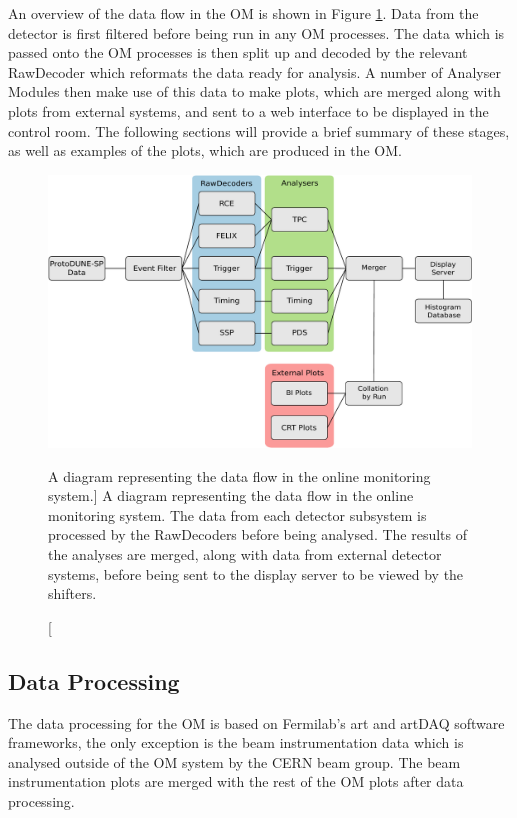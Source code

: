An overview of the data flow in the OM is shown in Figure \ref{fig:om_flow}. 
Data from the detector is first filtered before being run in any OM processes. 
The data which is passed onto the OM processes is then split up and decoded by 
the relevant RawDecoder which reformats the data ready for analysis. A number 
of Analyser Modules then make use of this data to make plots, which are merged 
along with plots from external systems, and sent to a web interface to be 
displayed in the control room. The following sections will provide a brief 
summary of these stages, as well as examples of the plots, which are produced in
the OM.

\begin{figure}
	\centering
	\includegraphics[width=\textwidth]{figures/om_flow.pdf}
	\caption
	[A diagram representing the data flow in the \protodune{} online monitoring system.]
	{A diagram representing the data flow in the \protodune{} online monitoring
	system. The data from each detector subsystem is processed by the RawDecoders
	before being analysed. The results of the analyses are merged, along with data
	from external detector systems, before being sent to the display server to be
	viewed by the shifters.}
	\label{fig:om_flow}
\end{figure}

\subsection{Data Processing}
The data processing for the OM is based on Fermilab's art and artDAQ software
frameworks\cite{Green:2012gv, 6495515}, the only exception is the beam 
instrumentation data which is analysed outside of the OM system by the CERN 
beam group. The beam instrumentation plots are merged with the rest of the OM 
plots after data processing.

